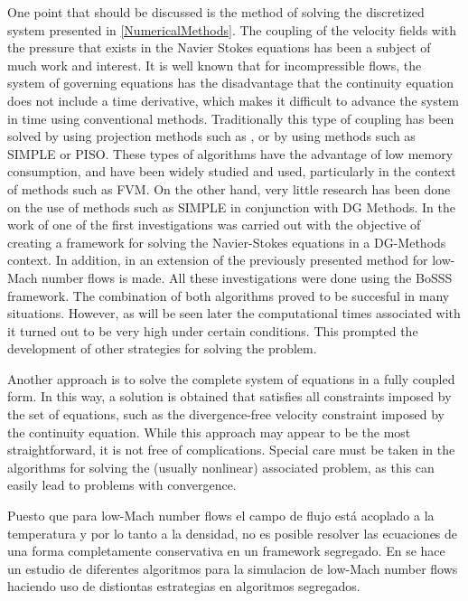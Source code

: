 One point that should be discussed is the method of solving the discretized system presented in \cref{NumericalMethods}. The coupling of the velocity fields with the pressure that exists in the Navier Stokes equations has been a subject of much work and interest. It is well known that for incompressible flows, the system of governing equations has the disadvantage that the continuity equation does not include a time derivative, which makes it difficult to advance the system in time using conventional methods. Traditionally this type of coupling has been solved by using projection methods such as \parencite{chorinNumericalSolutionNavierStokes1967}, or by using methods such as SIMPLE \parencite{patankarNumericalHeatTransfer1980} or PISO. These types of algorithms have the advantage of low memory consumption, and have been widely studied and used, particularly in the context of methods such as FVM. On the other hand, very little research has been done on the use of methods such as SIMPLE in conjunction with DG Methods. In the work of \textcite{kleinSIMPLEBasedDiscontinuous2013} one of the first investigations was carried out with the objective of creating a framework for solving the Navier-Stokes equations in a DG-Methods context. In addition, in \parencite{kleinHighorderDiscontinuousGalerkin2016} an extension of the previously presented method for low-Mach number flows is made. All these investigations were done using the BoSSS framework. The combination of both algorithms proved to be succesful in many situations. However, as will be seen later the computational times associated with it turned out to be very high under certain conditions. This prompted the development of other strategies for solving the problem. 


Another approach is to solve the complete system of equations in a fully coupled form. In this way, a solution is obtained that satisfies all constraints imposed by the set of equations, such as the divergence-free velocity constraint imposed by the continuity equation. While this approach may appear to be the most straightforward, it is not free of complications. Special care must be taken in the algorithms for solving the (usually nonlinear) associated problem, as this can easily lead to problems with convergence. 



Puesto que para low-Mach number flows el campo de flujo está acoplado a la temperatura y por lo tanto a la densidad, no es posible resolver las ecuaciones de una forma completamente conservativa en un framework segregado.  En \textcite{knikkerComparativeStudyHighorder2011} se hace un estudio de diferentes algoritmos para la simulacion de low-Mach number flows haciendo uso de distiontas estrategias en algoritmos segregados. 


